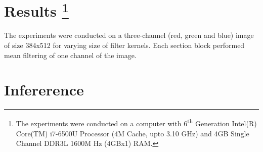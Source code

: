 \documentclass{article}
\begin{document}
	\section{Results \protect\footnote{The experiments were conducted on a computer with 6\textsuperscript{th} Generation Intel(R) Core(TM) i7-6500U Processor (4M Cache, upto 3.10 GHz) and 4GB Single Channel DDR3L 1600M Hz (4GBx1) RAM.}}
	
		The experiments were conducted on a three-channel (red, green and blue) image of size 384x512 for varying size of filter kernels. Each section block performed mean filtering of one channel of the image.
		
	\section{Infererence}
	
	
\end{document}
